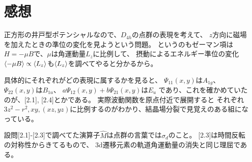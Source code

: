\documentclass[../ap_2023.tex]{subfiles}
\begin{document}
\section*{感想}
正方形の井戸型ポテンシャルなので、\(D_{4h}\)の点群の表現を考えて、
\(z\)方向に磁場を加えたときの準位の変化を見ようという問題。
というのもゼーマン項は\(H = -\mu  B\)で、\(\mu\)は角運動量\(L_z\)に比例して、
摂動によるエネルギー準位の変化\(\ev{-\mu B}\propto\ev{L_z}\)も\(\ev{L_z}\)を調べてやると分かるから。

具体的にそれぞれがどの表現に属するかを見ると、
\(\Psi_{11}(x,y)\)は\(A_{1g}\)、
\(\Psi_{22}(x,y)\)は\(B_{1u}\)、
\(a\Psi_{12}(x,y)+b\Psi_{21}(x,y)\)は\(E_{u}\)
であり、これを確かめていたのが、[2.1], [2.4]とかである。
実際波動関数を原点付近で展開すると
それぞれ\(3z^2-r^2,xy,(xz,yz)\)に比例するのがわかり、結晶場分裂で見覚えのある組になっている。

設問[2.1]-[2.3]で調べてた演算子\(\hat{M}\)は点群の言葉では\(\sigma_d\)のこと。
[2.3]は時間反転の対称性からきてるもので、
3d遷移元素の軌道角運動量の消失と同じ理屈である。
\end{document}

